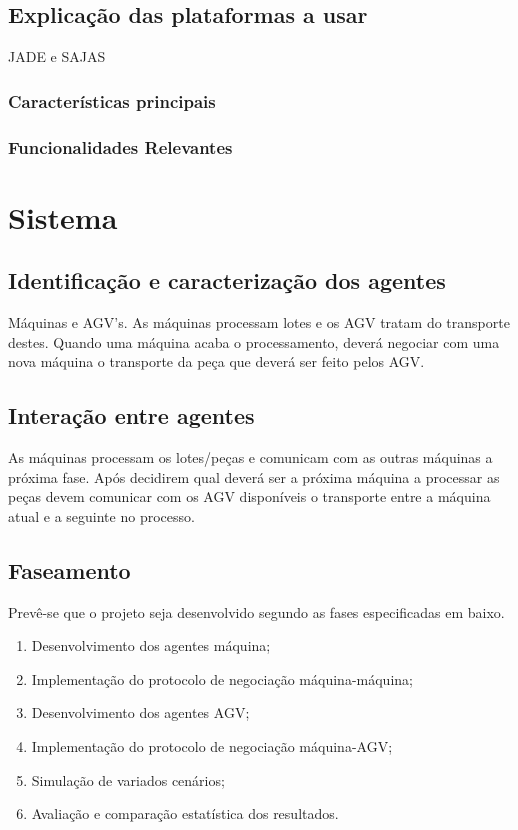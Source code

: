 \begin{titlepage}
\subsection{Explicação das plataformas a usar}
JADE e SAJAS

\subsubsection{Características principais}


\subsubsection{Funcionalidades Relevantes}



\section{Sistema}

\subsection{Identificação e caracterização dos agentes}
Máquinas e AGV's. As máquinas processam lotes e os AGV tratam do transporte destes. Quando uma máquina acaba o processamento, deverá negociar com uma nova máquina o transporte da peça que deverá ser feito pelos AGV.

\subsection{Interação entre agentes}
As máquinas processam os lotes/peças e comunicam com as outras máquinas a próxima fase. Após decidirem qual deverá ser a próxima máquina a processar as peças devem comunicar com os AGV disponíveis o transporte entre a máquina atual e a seguinte no processo.

\subsection{Faseamento}
Prevê-se que o projeto seja desenvolvido segundo as fases especificadas em baixo.

\begin{enumerate}
\item Desenvolvimento dos agentes máquina;
\item Implementação do protocolo de negociação máquina-máquina;
\item Desenvolvimento dos agentes AGV;
\item Implementação do protocolo de negociação máquina-AGV;
\item Simulação de variados cenários;
\item Avaliação e comparação estatística dos resultados.
\end{enumerate}


\end{titlepage}
